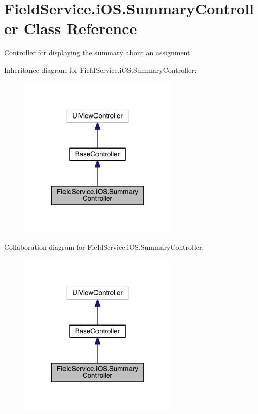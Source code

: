 \hypertarget{class_field_service_1_1i_o_s_1_1_summary_controller}{\section{Field\+Service.\+i\+O\+S.\+Summary\+Controller Class Reference}
\label{class_field_service_1_1i_o_s_1_1_summary_controller}
}


Controller for displaying the summary about an assignment  




Inheritance diagram for Field\+Service.\+i\+O\+S.\+Summary\+Controller\+:
\nopagebreak
\begin{figure}[H]
\begin{center}
\leavevmode
\includegraphics[width=216pt]{class_field_service_1_1i_o_s_1_1_summary_controller__inherit__graph}
\end{center}
\end{figure}


Collaboration diagram for Field\+Service.\+i\+O\+S.\+Summary\+Controller\+:
\nopagebreak
\begin{figure}[H]
\begin{center}
\leavevmode
\includegraphics[width=216pt]{class_field_service_1_1i_o_s_1_1_summary_controller__coll__graph}
\end{center}
\end{figure}
